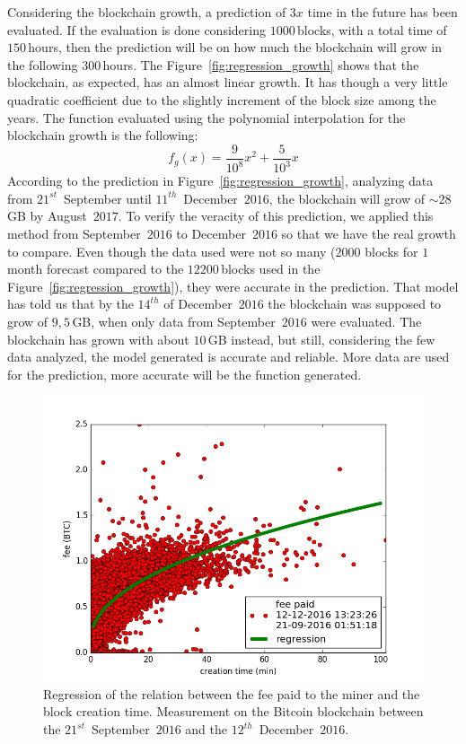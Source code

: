 \documentclass[USenglish]{uit-thesis}
\begin{document}
Considering the blockchain growth, a prediction of $3x$ time in the future has been evaluated. If
the evaluation is done considering $1000$\,blocks, with a total time of $150$\,hours, then the
prediction will be on how much the blockchain will grow in the following $300$\,hours.
The Figure~\ref{fig:regression_growth} shows that the blockchain, as expected, has an
almost linear growth. It has though a very little quadratic coefficient due to the
slightly increment of the block size among the years. The function evaluated using the polynomial
interpolation for the blockchain growth is the following:
\begin{equation}
\label{eq:growth_regression}
f_g(x) = \frac{9}{10^8}x^2 + \frac{5}{10^{3}}x
\end{equation}
According to the prediction in Figure~\ref{fig:regression_growth}, analyzing data
from $21^{st}$~September until $11^{th}$~December~$2016$, the blockchain
will grow of $\sim28$\,GB by August~$2017$.
To verify the veracity of this prediction, we applied this method from September~$2016$
to December~$2016$ so that we have the real growth to compare. Even though the data
used were not so many ($2000$ blocks for $1$ month forecast compared to the $12200$\,blocks
used in the Figure~\ref{fig:regression_growth}), they were accurate in the prediction.
That model has told us that by the $14^{th}$ of December~$2016$ the blockchain was
supposed to grow of $9,5$\,GB, when only data from September~$2016$
were evaluated. The blockchain has grown with about $10$\,GB instead, but
still, considering the few data analyzed, the model generated is accurate and reliable.
More data are used for the prediction, more accurate will be the function generated.

\begin{figure}[h]
	\centering
	\includegraphics[width=1\textwidth]{img/fee_regression}
	\caption{Regression of the relation between the fee paid
		to the miner and the block creation time.
		Measurement on the Bitcoin blockchain between
		the $21^{st}$~September~$2016$ and
		the $12^{th}$~December~$2016$.}
	\label{fig:fee_regression}
\end{figure}
\end{document}
